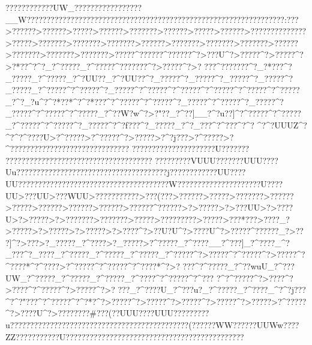 {{{{{{{{{{{{{{{{{{{{{{{{{{{{{{{{{{{{{{{{{{{{{{{{{{{{{{{{{{{{{{{{{{{{{{{{{{{{{{{{{{{{{{{{{{{{{{{{{{{{{{{{{{{{{{{{{{{{{{{{{{{{{{{{{{{{{{{{{{{{{{{{{{{{{{{{{{{{{{{{{{{{{{{{{{{{{{{{{{{{{{{{{{{{{{{{{{{{{{{{{{{{{{{{{{{{{{{{{{{{{{{{{{{{{{{{{{{{{{{{{{{{{{{{{{{{{{{{{{{{{{{{{{{{{{{{{{{{{{{{{{{{{{{{{{{{{{{{{{{{{{{{{{{{{{{{{{{{{{{{{{{{{{{{{{{{{{{{{{{{{{{{{{{{{{{{{{{{{{{{{{{{{{{{{{{{{{{{{{{{{{{{{{{{{{{{{{{{{{{{{{{{{{{{{{{{{{{{{{{{{{{{{{{{{{{{{{{{{{{{{{{{{{{{{{{{{{{{{{{{{{{{{{{{{{{{{{{{{{{{{{{{{{{{{{{{{{{{{{{{{{{{{{{{{{{{{{{{{{{{{{{{{{{{{{{{{{{{{{{{{{{{{{{{{{{{{{{{{{{{{{{{{{{{{{{{{{{{{{{{{{{{{{{{{{{{{{{{{{{{{{{{{{{{{{{{{{{{{{{{{{{{{{{{{{{{{{{{{{{????????????UW_?????????????????__W?????????????????????????????????????????????????????????????????:???>??????>??????>?????>??????>???????>??????>?????>??????>??????????????>?????>???????>???????>???????>??? ???>???????>???????>???????>??? ???>??? ????>???????>???????>?????^??????^??????^?>???U^?>?????^?>?????^?>? *??^?^?    _?^?????_?^?????^???????^?>?????^?>?
???^???????^?_?*???^?_?????_?^?????_?^?UU??_?^?UU??^?_?????^?_?????^?_?????^?_?????^?_?????_?^?????^?^?????^?_?????^?^?????^?^?????^?^?????^?^?????^?^?????_?^?}_?u^?^?*??*^?^?*???^?^?????^?^?????^?_?????^?^?????^?_?????^?_?????^?^?????^?^?????_?^??W?w^?>? "??_?^??}]__?^?u??]^?^?????^?^?????_?^?????^?^?????^?_?????^?^?f???^?_?????_?^?_???^?^???^?^?  
^?^?UUUZ^?^?    ^?^????U>?^?????>?^?????^?>?????>?^?j???>?^?????>?^????????????????????????? ?????
 ?????????????????    ????U????????????????????????????????????????????
?????????VUUU??    ??    ???UUU????Uu??????????????????????????????????????j????????????UU????UU??????????????????????????????????????W?????????????????????U????UU>???}UU>???WUU>???????????>???(???>??????>?? ???>???????>??????>?????>??????>??????>??????>??????^??????>?>?????>?>???UU>?>????U>?>?????>?>???????>???????>?????>?????????>?????>???*???>??  ??_?>?????>?>?????>?>?????>?>????^?>??U?U^?>????U^?>?????^?????? _?>???]^?>???>?_?????_?^????>?_?????>?^?????_?^????__?^???]_?^????_^?_???^?_????_?^?????_?^?????_?^?????_?^?????^?>?????^?^?????^?>?????^?^????*^?^???? >?^?????^?^?????^?^????*^?>?
???^?^?????_?^??wuU_?^???UW_?^?????_?^?????_?^?????_?^????^?^?????^?^???
?^?^?????^?>? ???^?>? ???^?^?????^?>?????^?>?
???_?^????U_?^???u?_?^?????_?^????_^?^?j???^?^?"???^?^?????^?^?*?^?>?????^?>?????^?>?????^?>?????^?>?????>?^?????^?>????U^?>????????#  ???  ( ??UUU????UUU??????? ??u}?????????????????????????????????????????????(??????WW????    ??UUWw????ZZ???????????U?????????????????????????????????????????????
}}}}}}}}}}}}}}}}}}}}}}}}}}}}}}}}}}}}}}}}}}}}}}}}}}}}}}}}}}}}}}}}}}}}}}}}}}}}}}}}}}}}}}}}}}}}}}}}}}}}}}}}}}}}}}}}}}}}}}}}}}}}}}}}}}}}}}}}}}}}}}}}}}}}}}}}}}}}}}}}}}}}}}}}}}}}}}}}}}}}}}}}}}}}}}}}}}}}}}}}}}}}}}}}}}}}}}}}}}}}}}}}}}}}}}}}}}}}}}}}}}}}}}}}}}}}}}}}}}}}}}}}}}}}}}}}}}}}}}}}}}}}}}}}}}}}}}}}}}}}}}}}}}}}}}}}}}}}}}}}}}}}}}}}}}}}}}}}}}}}}}}}}}}}}}}}}}}}}}}}}}}}}}}}}}}}}}}}}}}}}}}}}}}}}}}}}}}}}}}}}}}}}}}}}}}}}}}}}}}}}}}}}}}}}}}}}}}}}}}}}}}}}}}}}}}}}}}}}}}}}}}}}}}}}}}}}}}}}}}}}}}}}}}}}}}}}}}}}}}}}}}}}}}}}}}}}}}}}}}}}}}}}}}}}}}}}}}}}}}}}}}}}}}}}}}}}}}}}}}}}}}}}}}}}}}}}}}}}}}}}}}}}}}}}}}}}}}}}}}}}}}}}}}}}}}}}}}}}}}}}}}}}}}}}}}}}}}
